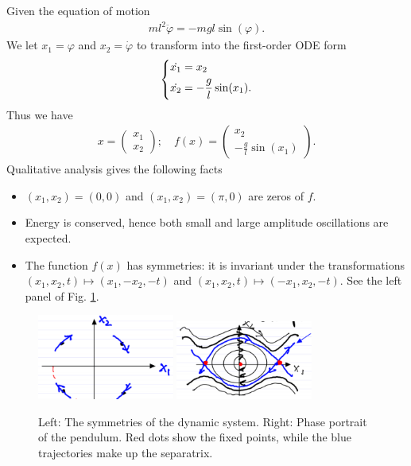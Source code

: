 \begin{ex}[Pendulum]
Given the equation of motion
\begin{align}
	ml^2 \ddot{\varphi} = -mgl \sin(\varphi).
\end{align}
We let $x_1 = \varphi$ and $x_2 =\dot{\varphi}$ to transform into the first-order ODE form
\begin{align}
	\begin{dcases}
		\dot{x_1} = x_2 \\
		\dot{x_2} = - \frac{g}{l} \sin (x_1).
	\end{dcases}
\end{align}
Thus we have 
\begin{align}
x = 
\begin{pmatrix}
	x_1 \\ x_2
\end{pmatrix}; \quad
f(x) = 
\begin{pmatrix}
	x_2 \\ - \frac{g}{l}\sin(x_1)	
\end{pmatrix}.
\end{align}
Qualitative analysis gives the following facts
\begin{itemize}
	\item $(x_1, x_2) = (0,0)$ and $(x_1, x_2) = (\pi , 0)$ are zeros of $f$.
	\item Energy is conserved, hence both small and large amplitude oscillations are expected.
	\item The function $f(x)$ has symmetries: it is invariant under the transformations $(x_1, x_2, t) \mapsto (x_1, -x_2, -t)$ and $(x_1, x_2, t) \mapsto (-x_1, x_2, -t)$. See the left panel of Fig. \ref{fig:intro:4}.
\end{itemize}
\begin{figure}[H]
	\centering
	\includegraphics[width=0.4\textwidth]{figures/intro/6pendulum_symmetries.png}
	\hspace{0.05\textwidth}
	\includegraphics[width=0.4\textwidth]{figures/intro/5pendulum.png}
	\caption{Left: The symmetries of the dynamic system. Right: Phase portrait of the pendulum. Red dots show the fixed points, while the blue trajectories make up the separatrix.}
	\label{fig:intro:4}


\end{figure}
\end{ex}
